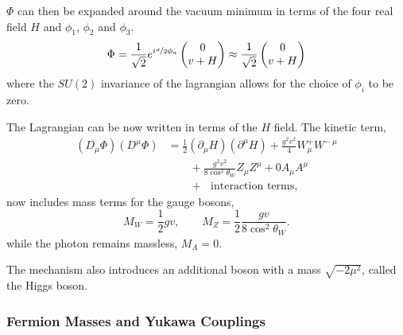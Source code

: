 $\Phi$ can then be expanded around the vacuum minimum in terms of the four real
field $H$ and $\phi_1$, $\phi_2$ and $\phi_3$.
\begin{equation}
\label{eq:phi}
\Phi = 
\frac{1}{\sqrt{2}}
e^{i\nicefrac{\sigma}{2}\phi_a}
\left(\begin{matrix}0\\v+H\end{matrix}\right)
\approx 
\frac{1}{\sqrt{2}}
\left(\begin{matrix}0\\v+H\end{matrix}\right)
\end{equation}
where the $SU(2)$ invariance of the lagrangian allows for the choice of $\phi_i$
to be zero\cite{halzen1984quarks,ral}.

The Lagrangian can be now written in terms of the $H$ field. The kinetic
term,\cite{ral}
\begin{align}
\left(D_{\mu}\Phi\right) \left(D^{\mu}\Phi\right) 
&= \frac{1}{2} \left(\partial_{\mu}H\right) \left(\partial^{\mu}H\right) 
         + \frac{g^{2}v^{2}}{4} W_{\mu}^{+} W^{-~\mu} \nonumber \\
&\qquad{}+ \frac{g^{2}v^{2}}{8 \cos^{2}\theta_{W}} Z_{\mu} Z^{\mu} + 0 A_{\mu} A^{\mu} \nonumber \\
&\qquad{}+ \text{~ interaction terms},
\end{align}
now includes mass terms for the gauge bosons,
\begin{equation}
M_{W} = \frac{1}{2}gv, \qquad 
M_{Z} = \frac{1}{2}\frac{gv}{8\cos^{2}\theta_{W}} .
\end{equation}
while the photon remains massless, $M_{A}=0$.

The mechanism also introduces an additional boson with a mass
$\sqrt{-2\mu^{2}}$, called the Higgs boson.

\subsubsection{Fermion Masses and Yukawa Couplings}

